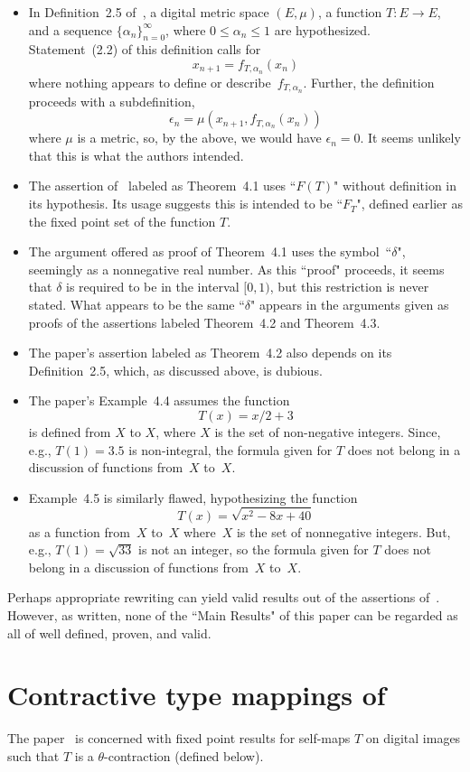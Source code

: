 \documentclass{article}
\numberwithin{thm}{section}
\begin{document}
\begin{itemize}
    \item In Definition~2.5 
of~\cite{BotmartEtal},
a digital metric
space $(E,\mu)$, a
function $T: E \to E$,
and a sequence 
$\{\alpha_n\}_{n=0}^\infty$, where
$0 \le \alpha_n \le 1$ are hypothesized.
Statement~(2.2) of
this definition calls for
\[ x_{n+1} =
   f_{T,\alpha_n}(x_n)
\]
where nothing appears
to define or 
describe~$f_{T,\alpha_n}$. Further,
the definition proceeds with a
subdefinition,
\[ \epsilon_n = 
\mu(x_{n+1}, f_{T,\alpha_n}(x_n))
\]
where $\mu$ is a metric,
so, by the above, we would have
$\epsilon_n = 0$.
It seems unlikely
that this is what
the authors intended.
\item The assertion of~\cite{BotmartEtal}
labeled as Theorem~4.1 uses ``$F(T)$" without
definition in its hypothesis. Its usage suggests
this is intended to be ``$F_T$", defined
earlier as the fixed point set of
the function $T$.
\item The argument
offered as proof of
Theorem~4.1 uses the
symbol~``$\delta$", 
seemingly as a 
nonnegative real number. As
this ``proof"
proceeds, it seems
that $\delta$ is
required to be
in the interval
$[0,1)$, but this
restriction is never
stated. What appears
to be the same
``$\delta$" appears
in the arguments
given as proofs of
the assertions labeled
Theorem~4.2 and
Theorem~4.3.
\item The paper's
assertion labeled as
Theorem~4.2 also 
depends on its
Definition~2.5,
which, as discussed 
above, is dubious.
\item The paper's
Example~4.4 
assumes the function
\[T(x) = x/2 + 3
\] 
is defined from $X$
to $X$, where $X$
is the set of
non-negative integers. 
Since, e.g.,
$T(1)=3.5$ is 
non-integral,
the formula given
for $T$ does not
belong in a discussion of
functions from~$X$
to~$X$.
\item Example~4.5 is
similarly flawed,
hypothesizing the
function 
\[ T(x) = \sqrt{x^2 - 8x + 40}
\]
as a function from~$X$ to~$X$ 
where~$X$ is the set
of nonnegative
integers. But, e.g.,
$T(1)=\sqrt{33}$ is
not an integer, so
the formula given
for $T$ does not
belong in a discussion of
functions from~$X$
to~$X$.
\end{itemize}

Perhaps appropriate rewriting can
yield valid results out of the assertions
of~\cite{BotmartEtal}. However, as written, 
none of the
``Main Results" of
this paper can be
regarded as all of
well defined, proven,
and valid.

\section{Contractive type mappings of~\cite{GuptaEtal}}
The paper~\cite{GuptaEtal} is concerned with
fixed point results
for self-maps $T$ on
digital images such that $T$ is a
$\theta$-contraction 
(defined below).
\end{document}
